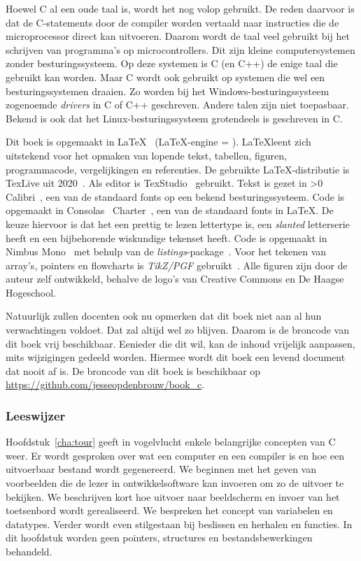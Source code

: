 Hoewel C al een oude taal is, wordt het nog volop gebruikt. De reden daarvoor is
dat de C-statements door de compiler worden vertaald naar instructies die de
microprocessor direct kan uitvoeren. Daarom wordt de taal veel gebruikt bij
het schrijven van programma's op microcontrollers. Dit zijn kleine computersystemen
zonder besturingssysteem. Op deze systemen is C (en C++) de enige taal die
gebruikt kan worden. Maar C wordt ook gebruikt op systemen die wel een
besturingssystemen draaien. Zo worden bij het Windows-besturingssysteem
zogenoemde \textsl{drivers} in C of C++ geschreven. Andere talen zijn niet
toepasbaar. Bekend is ook dat het Linux-besturingssysteem grotendeels is
geschreven in C.

Dit boek is opgemaakt in \LaTeX~\cite{latexwebsite} (\LaTeX-engine = \booktexbanner).
\LaTeX\@ leent zich uitstekend
voor het opmaken van lopende tekst, tabellen, figuren, programmacode, vergelijkingen
en referenties. De gebruikte \LaTeX-distributie is TexLive uit 2020~\cite{texlivewebsite}.
Als editor is TexStudio~\cite{texstudiowebsite} gebruikt. Tekst is gezet in
\fi{}\fi>0
Calibri~\cite{calibrifont}, een van de standaard fonts op een bekend besturingssysteem.
Code is opgemaakt in Consolas~\cite{consolasfont}
\else
Charter~\cite{charterfont}, een van de standaard fonts in \LaTeX.
De keuze hiervoor is dat het een prettig te lezen lettertype is, een
\textsl{slanted} letterserie heeft en een bijbehorende wiskundige tekenset heeft.
Code is opgemaakt in Nimbus Mono~\cite{nimbusfont}
\fi
met behulp van de \textsl{listings}-package~\cite{listingsctan}.
Voor het
tekenen van array's, pointers en flowcharts is \textsl{TikZ/PGF} gebruikt~\cite{tikzctan}.
Alle figuren zijn door de auteur zelf ontwikkeld, behalve de logo's van Creative
Commons en De Haagse Hogeschool.

Natuurlijk zullen docenten ook nu opmerken dat dit boek niet aan al hun
verwachtingen voldoet. Dat zal altijd wel zo blijven. Daarom is de broncode
van dit boek vrij beschikbaar. Eenieder die dit wil, kan de inhoud
vrijelijk aanpassen, mits wijzigingen gedeeld
worden. Hiermee wordt dit boek een levend document dat nooit af is.
De broncode
van dit boek is beschikbaar op \url{https://github.com/jesseopdenbrouw/book_c}.



\subsubsection*{Leeswijzer}
Hoofdstuk~\ref{cha:tour} geeft in vogelvlucht enkele belangrijke concepten van  C weer. Er wordt gesproken over wat een computer en een compiler is en hoe een uitvoerbaar bestand wordt gegenereerd. We beginnen met het geven van voorbeelden die de lezer in ontwikkelsoftware kan invoeren om zo de uitvoer te bekijken. We beschrijven kort hoe uitvoer naar beeldscherm en invoer van het toetsenbord wordt gerealiseerd. We bespreken het concept van variabelen en datatypes. Verder wordt even stilgestaan bij beslissen en herhalen en functies. In dit hoofdstuk worden geen pointers, structures en bestandsbewerkingen behandeld.

